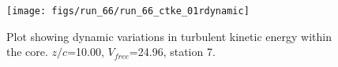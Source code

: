 \begin{figure}[H]
\centering
\texttt{[image: figs/run\_66/run\_66\_ctke\_01rdynamic]}
\caption{Plot showing dynamic variations in turbulent kinetic energy within the core. $z/c$=10.00, $V_{free}$=24.96, station 7.}
\end{figure}


